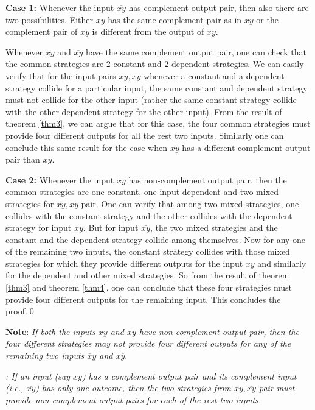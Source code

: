 \documentclass[]{svjour3}
\begin{document}
\textbf{Case 1:} Whenever the input $\overline{xy}$ has complement output pair, then also there are two possibilities. Either $\overline{xy}$ has the same complement pair as in $xy$ or the complement pair of $\overline{xy}$ is different from the output of $xy$.

Whenever $xy$ and $\overline{xy}$ have the same complement output pair, one can check that the common strategies are $2$ constant and $2$ dependent strategies. We can easily verify that for the input pairs $xy, \overline{xy}$ whenever a constant and a dependent strategy collide for a particular input, the same constant
and dependent strategy must not collide for the other input (rather the same constant strategy collide with the other dependent strategy for the other input). From the result of theorem \ref{thm3}, we can argue that for this case, the four common strategies must provide four different outputs for all the rest two inputs. Similarly one can conclude this same result for the case when $\overline{xy}$ has a different complement output pair than $xy$.

\textbf{Case 2:} Whenever the input $\overline{xy}$ has non-complement output pair, then the common strategies are one constant, one input-dependent and two mixed strategies for $xy, \overline{xy}$ pair. One can verify that among two mixed strategies, one collides with the constant strategy and the other collides with the dependent strategy for input $xy$. But for input $\overline{xy}$, the two mixed strategies and the constant and the dependent strategy collide among themselves. Now for any one of the remaining two inputs, the constant strategy collides with
those mixed strategies for which they provide different outputs
for the input $xy$ and similarly for the dependent and other mixed
strategies. So from the result of theorem \ref{thm3} and theorem \ref{thm4}, one can conclude that these four strategies must provide four different outputs for the remaining input. This concludes the proof.\qed



\textbf{Note}: {\it If both the inputs $xy$ and $\overline{xy}$ have non-complement output pair, then the four different strategies may not provide four different outputs for any of the remaining two inputs $\overline{x}y$ and $x\overline{y}$}.



\begin{lemma}
\label{lem1}	
{\it : If an input (say $xy$) has a complement output pair and its complement input (i.e., $\overline{xy}$) has only one outcome, then the two strategies from $xy, \overline{xy}$ pair must provide non-complement output pairs for each of the rest two inputs.}
\end{lemma}
\end{document}
